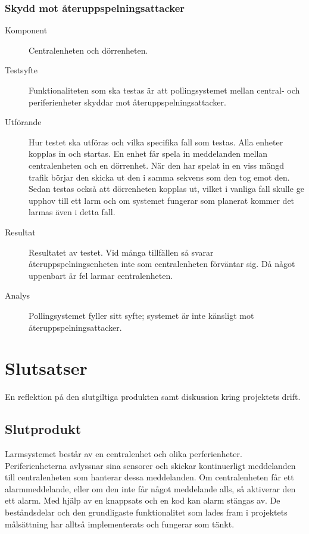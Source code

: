 \documentclass[a4paper]{article}
\begin{document}
\subsubsection{Skydd mot återuppspelningsattacker}
\begin{description}
\item[Komponent] Centralenheten och dörrenheten.

\item[Testsyfte] Funktionaliteten som ska testas är att pollingsystemet mellan central- och periferienheter skyddar mot återuppspelningsattacker.

\item[Utförande] Hur testet ska utföras och vilka specifika fall som testas. Alla enheter kopplas in och startas. En enhet får spela in meddelanden mellan centralenheten och en dörrenhet. När den har spelat in en viss mängd trafik börjar den skicka ut den i samma sekvens som den tog emot den. Sedan testas också att dörrenheten kopplas ut, vilket i vanliga fall skulle ge upphov till ett larm och om systemet fungerar som planerat kommer det larmas även i detta fall.

\item[Resultat] Resultatet av testet. Vid många tillfällen så svarar återuppspelningsenheten inte som centralenheten förväntar sig. Då något uppenbart är fel larmar centralenheten.

\item[Analys] Pollingsystemet fyller sitt syfte; systemet är inte känsligt mot återuppspelningsattacker.
\end{description}


\section{Slutsatser}
En reflektion på den slutgiltiga produkten samt diskussion kring projektets drift.
\subsection{Slutprodukt}

Larmsystemet består av en centralenhet och olika perferienheter.
Periferienheterna avlyssnar sina sensorer och skickar kontinuerligt meddelanden till centralenheten som hanterar dessa meddelanden.
Om centralenheten får ett alarmmeddelande, eller om den inte får något meddelande alls, så aktiverar den ett alarm.
Med hjälp av en knappsats och en kod kan alarm stängas av.
De beståndsdelar och den grundligaste funktionalitet som lades fram i projektets målsättning har alltså implementerats och fungerar som tänkt.
\end{document}

